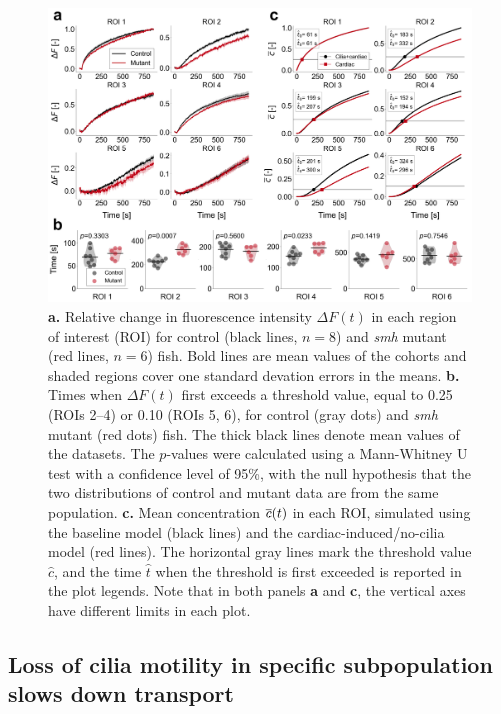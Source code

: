 \documentclass{WileyMSP-template}
\begin{document}
\begin{figure}[H]
    \centering
    \includegraphics[width=\textwidth]{graphics/figure4_compare_control_mutant.png}
    \caption{\textbf{a.} Relative change in fluorescence intensity $\Delta F(t)$
    in each region of interest (ROI) for control (black lines, $n=8$)
    and \emph{smh} mutant (red lines, $n=6$) fish. 
    Bold lines are mean values of the cohorts and shaded regions cover one standard devation errors
    in the means.
    \textbf{b.} Times when $\Delta F(t)$ first exceeds a threshold value,
    equal to 0.25 (ROIs 2--4) or 0.10 (ROIs 5, 6), for control (gray dots) and
    \emph{smh} mutant (red dots) fish.
    The thick black lines denote mean values of the datasets. The $p$-values
    were calculated using a Mann-Whitney U test with a confidence level of 95\%, with 
    the null hypothesis that the two distributions of control and mutant data are 
    from the same population.
    \textbf{c.} Mean concentration $\overline{c}(t)$ in each ROI,
    simulated using the baseline model (black lines) and the cardiac-induced/no-cilia model (red lines).
    The horizontal gray lines mark the threshold value $\hat{c}$, and the time
    $\hat{t}$ when the threshold is first exceeded is reported in the plot legends.
    Note that in both panels \textbf{a} and \textbf{c}, the vertical axes have
    different limits in each plot.}
    \label{fig:fig4}
\end{figure}

\subsection{Loss of cilia motility in specific subpopulation slows down transport}
\end{document}

